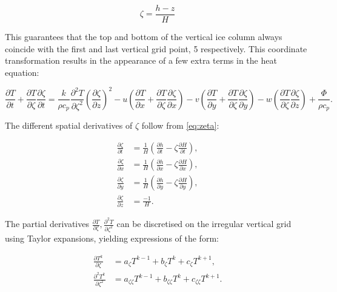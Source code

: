 \documentclass{article}
\begin{document}
\begin{equation} \label{eq:zeta}
\zeta = \frac{h-z}{H}
\end{equation}

This guarantees that the top and bottom of the vertical ice column always coincide with the first and last vertical grid point, 5 respectively. This coordinate transformation results in the appearance of a few extra terms in the heat equation:

\begin{equation}
\frac{\partial T}{\partial t} + \frac{\partial T}{\partial \zeta} \frac{\partial \zeta}{\partial t} =
\frac{k}{\rho c_p} \frac{\partial^2 T}{\partial \zeta^2} {\left( \frac{\partial \zeta}{\partial z} \right) }^2
- u \left( \frac{\partial T}{\partial x} + \frac{\partial T}{\partial \zeta} \frac{\partial \zeta}{\partial x} \right)
- v \left( \frac{\partial T}{\partial y} + \frac{\partial T}{\partial \zeta} \frac{\partial \zeta}{\partial y} \right)
- w \left( \frac{\partial T}{\partial \zeta} \frac{\partial \zeta}{\partial z} \right)
+ \frac{\Phi}{\rho c_p}.
\end{equation}

The different spatial derivatives of $\zeta$ follow from \eqref{eq:zeta}:

\begin{align}
\frac{\partial \zeta}{\partial t} &= \frac{1}{H} \left( \frac{\partial h}{\partial t} - \zeta \frac{\partial H}{\partial t} \right), \\
\frac{\partial \zeta}{\partial x} &= \frac{1}{H} \left( \frac{\partial h}{\partial x} - \zeta \frac{\partial H}{\partial x} \right), \\
\frac{\partial \zeta}{\partial y} &= \frac{1}{H} \left( \frac{\partial h}{\partial y} - \zeta \frac{\partial H}{\partial y} \right), \\
\frac{\partial \zeta}{\partial z} &= \frac{-1}{H}.
\end{align}

The partial derivatives $\frac{\partial T}{\partial \zeta}, \frac{\partial^2 T}{\partial \zeta^2}$ can be discretised on the irregular vertical grid using Taylor expansions, yielding expressions of the form:

\begin{align}
\frac{\partial T^k}{\partial \zeta} &= a_{\zeta} T^{k-1} + b_{\zeta} T^k + c_{\zeta} T^{k+1}, \\
\frac{\partial^2 T^k}{\partial \zeta^2} &= a_{\zeta \zeta} T^{k-1} + b_{\zeta \zeta} T^k + c_{\zeta \zeta} T^{k+1}.
\end{align}
\end{document}
